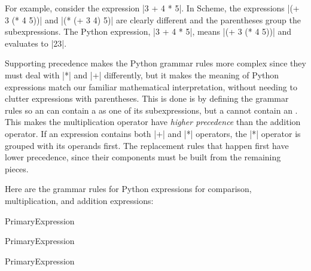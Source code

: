 For example, consider the expression \pycode|3 + 4 * 5|.  In Scheme, the expressions \scheme|(+ 3 (* 4 5))| and \scheme|(* (+ 3 4) 5)| are clearly different and the parentheses group the subexpressions.  The Python expression, \pycode|3 + 4 * 5|, means \scheme|(+ 3 (* 4 5))| and evaluates to \presult|23|.  %

Supporting precedence makes the Python grammar rules more complex since they must deal with \pycode|*| and \pycode|+| differently, but it makes the meaning of Python expressions match our familiar mathematical interpretation, without needing to clutter expressions with parentheses.  This is done is by defining the grammar rules so an  can contain a  as one of its subexpressions, but a  cannot contain an .  This makes the multiplication operator have \emph{high\-er pre\-ce\-dence} than the addition operator.  If an expression contains both \pycode|+| and \pycode|*| operators, the \pycode|*| operator is grouped with its operands first.  The replacement rules that happen first have lower precedence, since their components must be built from the remaining pieces. 

Here are the grammar rules for Python expressions for comparison, multiplication, and addition expressions:
\begin{bnfgrammarm}{PrimaryExpression}
\end{bnfgrammarm}

\begin{bnfgrammarm}{PrimaryExpression}
\end{bnfgrammarm}

\begin{bnfgrammarm}{PrimaryExpression}
\end{bnfgrammarm}


